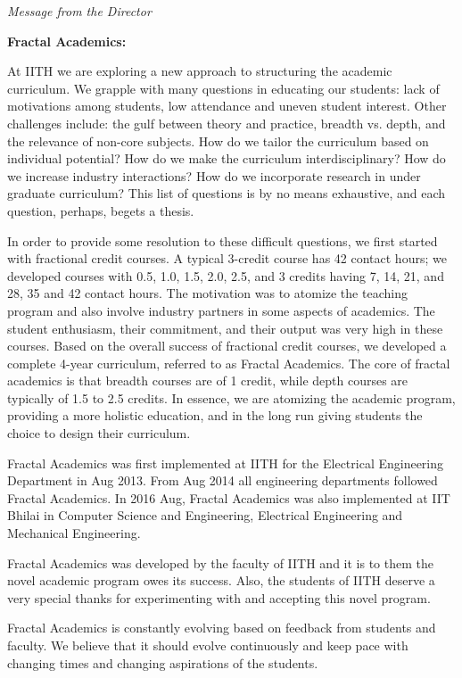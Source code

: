 {\it Message from the Director}


{\bf Fractal Academics:}
	
At IITH we are exploring a new approach to structuring the academic curriculum. We grapple with many questions in educating our students:  lack of motivations among students, low attendance and uneven student interest.  Other challenges include:  the gulf between theory and practice, breadth vs. depth, and the relevance of non-core subjects. How do we tailor the curriculum based on individual potential? How do we make the curriculum interdisciplinary? How do we increase industry interactions? How do we incorporate research in under graduate curriculum? This list of questions is by no means exhaustive, and each question, perhaps, begets a thesis. 

In order to provide some resolution to these difficult questions, we first started with fractional credit courses. A typical 3-credit course has 42 contact hours; we developed courses with 0.5, 1.0, 1.5, 2.0, 2.5, and 3 credits having 7, 14, 21, and 28, 35 and 42 contact hours. The motivation was to atomize the teaching program and also involve industry partners in some aspects of academics.  The student enthusiasm, their commitment, and their output was very high in these courses. Based on the overall success of fractional credit courses, we developed a complete 4-year curriculum, referred to as Fractal Academics.  The core of fractal academics is that breadth courses are of 1 credit, while depth courses are typically of 1.5 to 2.5 credits. In essence, we are atomizing the academic program, providing a more holistic education, and in the long run giving students the choice to design their curriculum.

Fractal Academics was first implemented at IITH for the Electrical Engineering Department in Aug 2013. From Aug 2014 all engineering departments followed Fractal Academics. In 2016 Aug, Fractal Academics was also implemented at IIT Bhilai in Computer Science and Engineering, Electrical Engineering and Mechanical Engineering. 

Fractal Academics was developed by the faculty of IITH and it is to them the novel academic program owes its success. Also, the students of IITH deserve a very special thanks for experimenting with and accepting this novel program.

Fractal Academics is constantly evolving based on feedback from students and faculty. We believe that it should evolve continuously and keep pace with changing times and changing aspirations of the students.  
